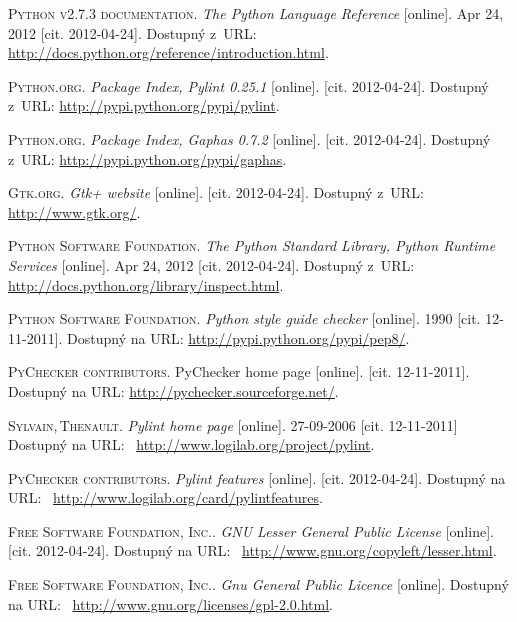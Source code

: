 \documentclass[11pt,oneside,final]{fithesis2}
\begin{document}
\begin{thebibliography}{99}

		\textsc{Python v2.7.3 documentation}.
		\textit{The Python Language Reference} [online].
		Apr 24, 2012 [cit. \mbox{2012-04-24}].
		Dostupný z~URL:
		\url{http://docs.python.org/reference/introduction.html}.
		
		
		\textsc{Python.org}.
		\textit{Package Index, Pylint 0.25.1} [online].
		[cit. \mbox{2012-04-24}].
		Dostupný z~URL:
		\url{http://pypi.python.org/pypi/pylint}.

		\textsc{Python.org}.
		\textit{Package Index, Gaphas 0.7.2} [online].
		[cit. \mbox{2012-04-24}].
		Dostupný z~URL:
		\url{http://pypi.python.org/pypi/gaphas}.

		\textsc{Gtk.org}.
		\textit{Gtk+ website} [online].
		[cit. \mbox{2012-04-24}].
		Dostupný z~URL:
		\url{http://www.gtk.org/}.
		
		\textsc{Python Software Foundation}.
		\textit{The Python Standard Library, Python Runtime Services} [online].
		Apr 24, 2012 [cit. \mbox{2012-04-24}].
		Dostupný z~URL:
		\url{http://docs.python.org/library/inspect.html}.
		
    \textsc{Python Software Foundation}.
    \textit{Python style guide checker} [online]. 1990 [cit. 12-11-2011].
    Dostupný na URL:
    \url{http://pypi.python.org/pypi/pep8/}.
    
    \textsc{PyChecker contributors}.
    {PyChecker home page} [online].
    [cit. 12-11-2011].
    Dostupný na URL:
    \url{http://pychecker.sourceforge.net/}.
    
    \textsc{Sylvain,\,Thenault}.
    \textit{Pylint home page} [online].
    27-09-2006
    [cit. 12-11-2011]
    Dostupný na URL:~
    \url{http://www.logilab.org/project/pylint}.
    
    \textsc{PyChecker contributors}.
    \textit{Pylint features} [online].
    [cit. \mbox{2012-04-24}].
    Dostupný na URL:~
    \url{http://www.logilab.org/card/pylintfeatures}.

    \textsc{Free Software Foundation, Inc.}.
    \textit{GNU Lesser General Public License} [online].
    [cit. \mbox{2012-04-24}].
    Dostupný na URL:~
    \url{http://www.gnu.org/copyleft/lesser.html}.   

    \textsc{Free Software Foundation, Inc.}.
    \textit{Gnu General Public Licence} [online].
    Dostupný na URL:~
    \url{http://www.gnu.org/licenses/gpl-2.0.html}.   


\end{thebibliography}
\end{document}
